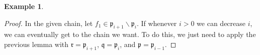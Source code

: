 \documentclass{amsart}[12pt]
\newcommand{\p}{{\mathfrak p}}
\newcommand{\q}{{\mathfrak q}}
\numberwithin{equation}{section}
\theoremstyle{plain} %
\theoremstyle{definition}
\newtheorem{ex}[equation]{Example}
\newtheorem{example}[equation]{Example}
\theoremstyle{remark}
\begin{document}
\begin{ex}
\begin{proof}
In the given chain, let $f_1 \in \p_{i+1} \smallsetminus \p_i$. If whenever $i>0$ we can decrease $i$, we can eventually get to the chain we want. To do this, we just need to apply the previous lemma with $\mathfrak{r}=\p_{i+1}$, $\q=\p_i$, and $\p=\p_{i-1}$.
\end{proof}

\begin{comment}

\begin{example}
	\begin{enumerate}
		\item The bound is certainly sharp: an ideal generated by $n$ variables $(x_1,x_2,\dots,x_n)$ in a polynomial ring has height~$n$. There are many other such ideals, like $(u^3-xyz,x^2+2xz-6y^5,vx+7vy)\in K[u,v,w,x,y,z]$. An ideal of height $n$ generated by $n$ elements is called a \emph{complete intersection}\index{complete intersection}.
		\item The ideal $(xy,xz)$ in $K[x,y,z]$ has minimal primes of heights 1 and 2.
		\item It is possible to have associated primes of height greater than the number of generators. For a cheap example, in $R=K[x,y]/(x^2,xy)$, the ideal generated by zero elements (the zero ideal) has an associated prime of height one, namely $(x,y)$.
		\item For the same phenomenon, but in a nice polynomial ring, $I=(x^3, y^3, x^2 u + xy v + y^2 w) \subset R= K[u,v,w,x,y]$. Note that $x^2 y^2 \notin (x^3,y^3, u,v,w) \supseteq I$, so $x^2 y^2\notin I$. On the other hand, we have
	\[	\begin{aligned}
		x(x^2 y^2) &= y^2 x^3\in I \\	y(x^2 y^2)&= x^2 y^3 \in I  \\
		u(x^2 y^2) &= y^2 ux^2 = -y^2(xyv + y^2w) \in I \\
		v(x^2 y^2) &= xy vxy = -xy (x^2 u + y^2 w) \in I \\
		w(x^2 y^2) &= x^2 w y^2 = -x^2( x^2 u + xy v) \in I,\end{aligned}\]
		so the maximal ideal of height five $(u,v,w,x,y)$ is associated to $I$.
		\end{enumerate}
\end{example}


\end{comment}
\end{ex}
\end{document}
